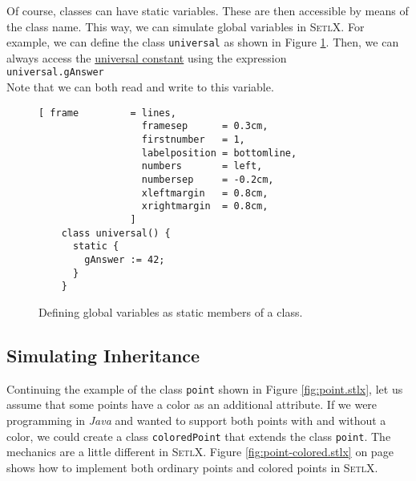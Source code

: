 Of course, classes can have static variables.  These are
then accessible by means  of the class name.  This way, we can simulate global variables in
\textsc{SetlX}.  For example, we can define the class \texttt{universal} as shown in Figure
\ref{fig:universal.stlx}.  Then, we can always access the 
\href{http://en.wikipedia.org/wiki/Answer_to_the_Ultimate_Question_of_Life,_the_Universe,_and_Everything#Answer_to_the_Ultimate_Question_of_Life.2C_the_Universe_and_Everything_.2842.29}{universal constant}
 using the expression
\\[0.2cm]
\hspace*{1.3cm}
\texttt{universal.gAnswer}
\\[0.2cm]
Note that we can both read and write to this variable.

\begin{figure}[!ht]
\centering
\begin{Verbatim}[ frame         = lines, 
                  framesep      = 0.3cm, 
                  firstnumber   = 1,
                  labelposition = bottomline,
                  numbers       = left,
                  numbersep     = -0.2cm,
                  xleftmargin   = 0.8cm,
                  xrightmargin  = 0.8cm,
                ]
    class universal() {
      static {
        gAnswer := 42;
      }
    }
\end{Verbatim}
\vspace*{-0.3cm}
\caption{Defining global variables as static members of a class.}
\label{fig:universal.stlx}
\end{figure}



\subsection{Simulating Inheritance}
Continuing the example of the class \texttt{point} shown in Figure \ref{fig:point.stlx}, let us
assume that some points have a color as an additional attribute.  If we were programming in
\textsl{Java} and wanted to support both points with and without a color, we could create a class
\texttt{coloredPoint} that extends the class \texttt{point}.  The mechanics are a little different
in \textsc{SetlX}.  Figure \ref{fig:point-colored.stlx} on page \pageref{fig:point-colored.stlx}
shows how to implement both ordinary points and colored points in \textsc{SetlX}.

